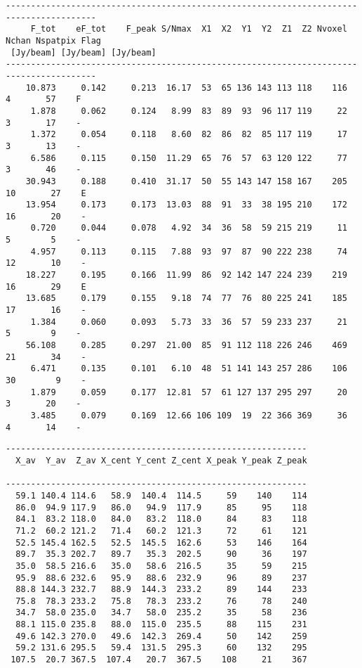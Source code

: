 {\begin{verbatim}
----------------------------------------------------------------------------------------
     F_tot    eF_tot    F_peak S/Nmax  X1  X2  Y1  Y2  Z1  Z2 Nvoxel Nchan Nspatpix Flag
 [Jy/beam] [Jy/beam] [Jy/beam]                                                          
----------------------------------------------------------------------------------------
    10.873     0.142     0.213  16.17  53  65 136 143 113 118    116     4       57    F
     1.878     0.062     0.124   8.99  83  89  93  96 117 119     22     3       17    -
     1.372     0.054     0.118   8.60  82  86  82  85 117 119     17     3       13    -
     6.586     0.115     0.150  11.29  65  76  57  63 120 122     77     3       46    -
    30.943     0.188     0.410  31.17  50  55 143 147 158 167    205    10       27    E
    13.954     0.173     0.173  13.03  88  91  33  38 195 210    172    16       20    -
     0.720     0.044     0.078   4.92  34  36  58  59 215 219     11     5        5    -
     4.957     0.113     0.115   7.88  93  97  87  90 222 238     74    12       10    -
    18.227     0.195     0.166  11.99  86  92 142 147 224 239    219    16       29    E
    13.685     0.179     0.155   9.18  74  77  76  80 225 241    185    17       16    -
     1.384     0.060     0.093   5.73  33  36  57  59 233 237     21     5        9    -
    56.108     0.285     0.297  21.00  85  91 112 118 226 246    469    21       34    -
     6.471     0.135     0.101   6.10  48  51 141 143 257 286    106    30        9    -
     1.879     0.059     0.177  12.81  57  61 127 137 295 297     20     3       20    -
     3.485     0.079     0.169  12.66 106 109  19  22 366 369     36     4       14    -
\end{verbatim}
\newpage
\begin{verbatim}
------------------------------------------------------------
  X_av  Y_av  Z_av X_cent Y_cent Z_cent X_peak Y_peak Z_peak
                                                            
------------------------------------------------------------
  59.1 140.4 114.6   58.9  140.4  114.5     59    140    114
  86.0  94.9 117.9   86.0   94.9  117.9     85     95    118
  84.1  83.2 118.0   84.0   83.2  118.0     84     83    118
  71.2  60.2 121.2   71.4   60.2  121.3     72     61    121
  52.5 145.4 162.5   52.5  145.5  162.6     53    146    164
  89.7  35.3 202.7   89.7   35.3  202.5     90     36    197
  35.0  58.5 216.6   35.0   58.6  216.5     35     59    215
  95.9  88.6 232.6   95.9   88.6  232.9     96     89    237
  88.8 144.3 232.7   88.9  144.3  233.2     89    144    233
  75.8  78.3 233.2   75.8   78.3  233.2     76     78    240
  34.7  58.0 235.0   34.7   58.0  235.2     35     58    236
  88.1 115.0 235.8   88.0  115.0  235.5     88    115    231
  49.6 142.3 270.0   49.6  142.3  269.4     50    142    259
  59.2 131.6 295.5   59.4  131.5  295.3     60    132    295
 107.5  20.7 367.5  107.4   20.7  367.5    108     21    367
\end{verbatim}
}

